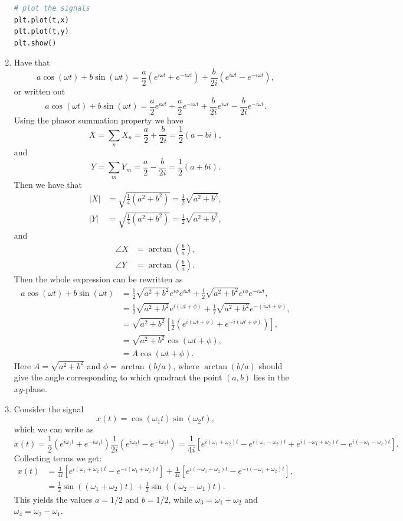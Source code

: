 \begin{enumerate}
\begin{lstlisting}[language=Python, caption=Noise canceling signal,label=cancel]
# plot the signals
plt.plot(t,x)
plt.plot(t,y)
plt.show()
\end{lstlisting}
\item Have that
$$a\cos(\omega t)+b\sin(\omega t)=\frac{a}{2}(e^{i\omega t}+e^{-i\omega t})+\frac{b}{2i}(e^{i\omega t}-e^{-i\omega t}),$$
or written out 
$$a\cos(\omega t)+b\sin(\omega t)=\frac{a}{2}e^{i\omega t}+\frac{a}{2}e^{-i\omega t}+\frac{b}{2i}e^{i\omega t}-\frac{b}{2i}e^{-i\omega t}.$$
Using the phasor summation property we have
$$X=\sum_{n}X_{n}=\frac{a}{2}+\frac{b}{2i}=\frac{1}{2}(a-bi),$$
and
$$Y=\sum_{m}Y_{m}=\frac{a}{2}-\frac{b}{2i}=\frac{1}{2}(a+bi).$$
Then we have that
\begin{align*}
    |X|&=\sqrt{\frac{1}{4}(a^{2}+b^{2})}=\frac{1}{2}\sqrt{a^{2}+b^{2}}, \\
    |Y|&=\sqrt{\frac{1}{4}(a^{2}+b^{2})}=\frac{1}{2}\sqrt{a^{2}+b^{2}},
\end{align*}
and
\begin{align*}
    \angle X&=\arctan\left(\frac{b}{a}\right), \\
    \angle Y&=\arctan\left(\frac{b}{a}\right).
\end{align*}
Then the whole expression can be rewritten as
\begin{align*}
    a\cos(\omega t)+b\sin(\omega t)&=\frac{1}{2}\sqrt{a^{2}+b^{2}}e^{i\phi}e^{i\omega t}+\frac{1}{2}\sqrt{a^{2}+b^{2}}e^{i\phi}e^{-i\omega t}, \\
    &=\frac{1}{2}\sqrt{a^{2}+b^{2}}e^{i(\omega t+\phi)}+\frac{1}{2}\sqrt{a^{2}+b^{2}}e^{-(i\omega t+\phi)}, \\
    &=\sqrt{a^{2}+b^{2}}\left[\frac{1}{2}\left(e^{i(\omega t+\phi)}+e^{-i(\omega t+\phi)}\right)\right], \\
    &=\sqrt{a^{2}+b^{2}}\cos(\omega t+\phi), \\
    &=A\cos(\omega t+\phi).
\end{align*}
Here $A=\sqrt{a^{2}+b^{2}}$ and $\phi=\arctan(b/a)$, where $\arctan(b/a)$ should give the angle corresponding to which quadrant the point $(a,b)$ lies in the $xy$-plane. 

\item Consider the signal 
$$x(t)=\cos(\omega_{1}t)\sin(\omega_{2}t),$$
which we can write as
$$x(t)=\frac{1}{2}(e^{i\omega_{1}t}+e^{-i\omega_{1} t})\frac{1}{2i}(e^{i\omega_{2}t}-e^{-i\omega_{2}t})=\frac{1}{4i}[e^{i(\omega_{1}+\omega_{2})t}-e^{i(\omega_{1}-\omega_{2})t}+e^{i(-\omega_{1}+\omega_{2})t}-e^{i(-\omega_{1}-\omega_{2})t}].$$
Collecting terms we get:
\begin{align*}
    x(t)&=\frac{1}{4i}[e^{i(\omega_{1}+\omega_{2})t}-e^{-i(\omega_{1}+\omega_{2})t}]+\frac{1}{4i}[e^{i(-\omega_{1}+\omega_{2})t}-e^{-i(-\omega_{1}+\omega_{2})t}], \\
    &=\frac{1}{2}\sin((\omega_{1}+\omega_{2})t)+\frac{1}{2}\sin((\omega_{2}-\omega_{1})t).
\end{align*}
This yields the values $a=1/2$ and $b=1/2$, while $\omega_{3}=\omega_{1}+\omega_{2}$ and $\omega_{4}=\omega_{2}-\omega_{1}$. 


\end{enumerate}
